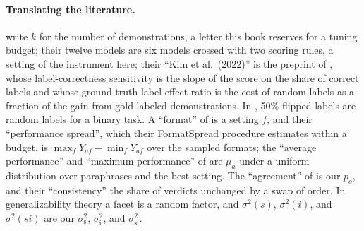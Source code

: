 \begin{refsection}
\paragraph{Translating the literature.} \Textcite{MinEtAl2022} write $k$ for the number of demonstrations, a letter this book reserves for a tuning budget; their twelve models are six models crossed with two scoring rules, a setting of the instrument here; their \enquote{Kim et al.\ (2022)} is the preprint of \textcite{YooEtAl2022}, whose label-correctness sensitivity is the slope of the score on the share of correct labels and whose ground-truth label effect ratio is the cost of random labels as a fraction of the gain from gold-labeled demonstrations. In \textcite{WeiEtAl2023larger}, 50\% flipped labels are random labels for a binary task. A \enquote{format} of \textcite{SclarEtAl2024} is a setting $f$, and their \enquote{performance spread}, which their FormatSpread procedure estimates within a budget, is $\max_fY_{af}-\min_fY_{af}$ over the sampled formats; the \enquote{average performance} and \enquote{maximum performance} of \textcite{MizrahiEtAl2024} are $\mu_a$ under a uniform distribution over paraphrases and the best setting. The \enquote{agreement} of \textcite{ZhengEtAl2023} is our $p_o$, and their \enquote{consistency} the share of verdicts unchanged by a swap of order. In generalizability theory a facet is a random factor, and $\sigma^2(s)$, $\sigma^2(i)$, and $\sigma^2(si)$ are our $\sigma_{\mathrm s}^2$, $\sigma_{\mathrm i}^2$, and $\sigma_{\mathrm{si}}^2$.

\printchapterbib
\end{refsection}

